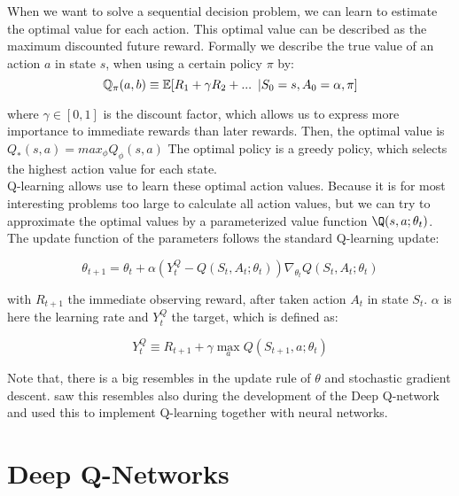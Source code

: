 \documentclass{sig-alternate}
\begin{document}
When we want to solve a sequential decision problem, we can learn to estimate the optimal value for each action. This optimal value can be described as the maximum discounted future reward. Formally we describe the true value of an action $a$ in state $s$, when using a certain policy $\pi$ by: 
\begin{equation}  
\mathbb{Q}_{\pi}(a,b)\equiv \mathbb{E}[R_{1}+\gamma R_{2}+...\enskip| S_{0} = s, A_{0}= \alpha, \pi]
\end{equation}

 where $\gamma\in[0,1]$ is the discount factor, which allows us to express more importance to immediate rewards than later rewards. Then, the optimal value is $Q_{*}(s,a) = max_{\phi}Q_{\phi}(s,a) $ The optimal policy is a greedy policy, which selects the highest action value for each state.\\
Q-learning \cite{watkins1992q} allows use to learn these optimal action values. Because it is for most interesting problems too large to calculate all action values, but we can try to approximate the optimal values by a parameterized value function $\Q(s,a;\theta_{t})$. The update function of the parameters follows the standard Q-learning update:

\begin{equation}
\label{parameter equation}
\theta_{t+1}= \theta_{t} + \alpha(Y_{t}^Q - Q(S_{t},A_{t};\theta_{t}))\nabla_{\theta_{t}}Q(S_{t},A_{t};\theta_t)
\end{equation}

with $R_{t+1}$ the immediate observing reward, after taken action $A_{t}$ in state $S_{t}$. $\alpha$ is here the learning rate and $Y_{t}^Q$ the target, which is defined as:

\begin{equation}
Y_{t}^Q \equiv R_{t+1} + \gamma \max_{a}Q(S_{t+1},a;\theta_{t})
\end{equation}


Note that, there is a big resembles in the update rule of $\theta$ and stochastic gradient descent. \cite{mnih2015human} saw this resembles also during the development of the Deep Q-network and used this to implement Q-learning together with neural networks.

\section{Deep Q-Networks}\label{Original DQN}
\end{document}
